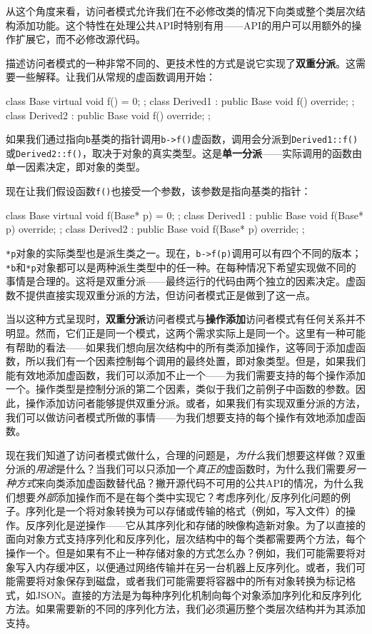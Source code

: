 从这个角度来看，访问者模式允许我们在不必修改类的情况下向类或整个类层次结构添加功能。这个特性在处理公共API时特别有用——API的用户可以用额外的操作扩展它，而不必修改源代码。

描述访问者模式的一种非常不同的、更技术性的方式是说它实现了\textbf{双重分派}。这需要一些解释。让我们从常规的虚函数调用开始：

\begin{code}
class Base {
  virtual void f() = 0;
};
class Derived1 : public Base {
  void f() override;
};
class Derived2 : public Base {
  void f() override;
};
\end{code}

如果我们通过指向\texttt{b}基类的指针调用\texttt{b-\textgreater{}f()}虚函数，调用会分派到\texttt{Derived1::f()}或\texttt{Derived2::f()}，取决于对象的真实类型。这是\textbf{单一分派}——实际调用的函数由单一因素决定，即对象的类型。

现在让我们假设函数\texttt{f()}也接受一个参数，该参数是指向基类的指针：

\begin{code}
class Base {
  virtual void f(Base* p) = 0;
};
class Derived1 : public Base {
  void f(Base* p) override;
};
class Derived2 : public Base {
  void f(Base* p) override;
};
\end{code}

\texttt{*p}对象的实际类型也是派生类之一。现在，\texttt{b-\textgreater{}f(p)}调用可以有四个不同的版本；\texttt{*b}和\texttt{*p}对象都可以是两种派生类型中的任一种。在每种情况下希望实现做不同的事情是合理的。这将是双重分派——最终运行的代码由两个独立的因素决定。虚函数不提供直接实现双重分派的方法，但访问者模式正是做到了这一点。

当以这种方式呈现时，\textbf{双重分派}访问者模式与\textbf{操作添加}访问者模式有任何关系并不明显。然而，它们正是同一个模式，这两个需求实际上是同一个。这里有一种可能有帮助的看法——如果我们想向层次结构中的所有类添加操作，这等同于添加虚函数，所以我们有一个因素控制每个调用的最终处置，即对象类型。但是，如果我们能有效地添加虚函数，我们可以添加不止一个——为我们需要支持的每个操作添加一个。操作类型是控制分派的第二个因素，类似于我们之前例子中函数的参数。因此，操作添加访问者能够提供双重分派。或者，如果我们有实现双重分派的方法，我们可以做访问者模式所做的事情——为我们想要支持的每个操作有效地添加虚函数。

现在我们知道了访问者模式做什么，合理的问题是，\emph{为什么}我们想要这样做？双重分派的\emph{用途}是什么？当我们可以只添加一个\emph{真正的}虚函数时，为什么我们需要\emph{另一种方式}来向类添加虚函数替代品？撇开源代码不可用的公共API的情况，为什么我们想要\emph{外部}添加操作而不是在每个类中实现它？考虑序列化/反序列化问题的例子。序列化是一个将对象转换为可以存储或传输的格式（例如，写入文件）的操作。反序列化是逆操作——它从其序列化和存储的映像构造新对象。为了以直接的面向对象方式支持序列化和反序列化，层次结构中的每个类都需要两个方法，每个操作一个。但是如果有不止一种存储对象的方式怎么办？例如，我们可能需要将对象写入内存缓冲区，以便通过网络传输并在另一台机器上反序列化。或者，我们可能需要将对象保存到磁盘，或者我们可能需要将容器中的所有对象转换为标记格式，如JSON。直接的方法是为每种序列化机制向每个对象添加序列化和反序列化方法。如果需要新的不同的序列化方法，我们必须遍历整个类层次结构并为其添加支持。

